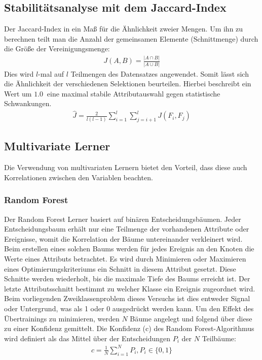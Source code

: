 \subsection{Stabilitätsanalyse mit dem Jaccard-Index}
\label{sec:jaccard}
Der Jaccard-Index in ein Maß für die Ähnlichkeit zweier Mengen.
Um ihn zu berechnen teilt man die Anzahl der gemeinsamen Elemente (Schnittmenge) durch die Größe der Vereinigungsmenge:
\begin{align*}
	J(A,B) = \frac{\vert A \cap B \vert}{\vert A \cup B \vert }
\end{align*}
Dies wird $l$-mal auf $l$ Teilmengen des Datensatzes angewendet. 
Somit lässt sich die Ähnlichkeit der verschiedenen Selektionen beurteilen.
Hierbei beschreibt ein Wert um $\SI{1.0}{}$ eine maximal stabile Attributauswahl gegen statistische Schwankungen.
\begin{align*}
	\hat{J} = \frac{2}{l(l-1)} \sum_{i=1}^l \sum_{j=i+1}^l J(F_i,F_j)
\end{align*}


\subsection{Multivariate Lerner}
\label{sec:multilearn}
Die Verwendung von multivariaten Lernern bietet den Vorteil, dass diese auch Korrelationen zwischen den Variablen beachten.

\subsubsection{Random Forest}
\label{sec:rndforest}
Der Random Forest Lerner basiert auf binären Entscheidungsbäumen. 
Jeder Entscheidungsbaum erhält nur eine Teilmenge der vorhandenen Attribute oder Ereignisse, womit die Korrelation der Bäume untereinander verkleinert wird.
Beim erstellen eines solchen Baums werden für jedes Ereignis an den Knoten die Werte eines Attributs betrachtet. 
Es wird durch Minimieren oder Maximieren eines Optimierungskriteriums ein Schnitt in diesem Attribut gesetzt.
Diese Schnitte werden wiederholt, bis die maximale Tiefe des Baums erreicht ist.
Der letzte Attributsschnitt bestimmt zu welcher Klasse ein Ereignis zugeordnet wird.
Beim vorliegenden Zweiklassenproblem dieses Versuchs ist dies entweder Signal oder Untergrund, was als 1 oder 0 ausgedrückt werden kann.
Um den Effekt des Übertrainings zu minimieren, werden $N$ Bäume angelegt und folgend über diese zu einer Konfidenz gemittelt. 
Die Konfidenz (c) des Random Forest-Algorithmus wird definiert als das Mittel über der Entscheidungen $P_i$ der $N$ Teilbäume:
\begin{align*}
	c= \frac{1}{N}\sum_{i=1}^NP_i, P_i \in \{0,1\}
\end{align*}

